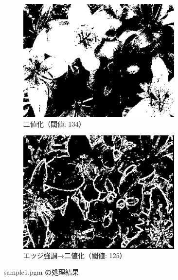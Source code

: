 \documentclass[a4paper,12pt]{jsarticle}
\begin{document}
\begin{figure}[!htbp]
\begin{subfigure}[b]{0.45\textwidth}
    \centering
    \includegraphics[width=0.9\textwidth]{./images/binarized_sample1_binary.png}
    \caption{二値化（閾値: 134）}
\end{subfigure}
\hfill
\begin{subfigure}[b]{0.45\textwidth}
    \centering
    \includegraphics[width=0.9\textwidth]{./images/combined_sample1_combined.png}
    \caption{エッジ強調→二値化（閾値: 125）}
\end{subfigure}
\caption{sample1.pgm の処理結果}
\label{fig:sample1}
\end{figure}
\end{document}
